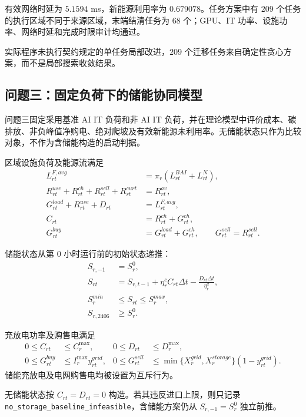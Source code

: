 有效网络时延为 $5.1594$ ms，新能源利用率为 $0.679078$。任务方案中有 $209$ 个任务的执行区域不同于来源区域，末端结清任务为 $68$ 个；GPU、IT 功率、设施功率、网络时延和完成时限审计均通过。

实际程序未执行契约规定的单任务局部改进，$209$ 个迁移任务来自确定性贪心方案，而不是局部搜索收敛结果。

\subsection{问题三：固定负荷下的储能协同模型}

问题三固定采用基准 AI IT 负荷和非 AI IT 负荷，并在理论模型中评价成本、碳排放、非负峰值净购电、绝对爬坡及有效新能源未利用率。无储能状态只作为比较对象，不作为含储能构造的启动判据。

区域设施负荷及能源流满足
\begin{align}
L_{rt}^{F,avg}&=\pi_r(L_{rt}^{BAI}+L_{rt}^{N}),\\
R_{rt}^{use}+R_{rt}^{ch}+R_{rt}^{sell}+R_{rt}^{curt}&=R_{rt}^{av},\\
G_{rt}^{load}+R_{rt}^{use}+D_{rt}&=L_{rt}^{F,avg},\\
C_{rt}&=R_{rt}^{ch}+G_{rt}^{ch},\\
G_{rt}^{buy}&=G_{rt}^{load}+G_{rt}^{ch},\qquad
G_{rt}^{sell}=R_{rt}^{sell}.
\end{align}

储能状态从第 $0$ 小时运行前的初始状态递推：
\begin{align}
S_{r,-1}&=S_r^0,\\
S_{rt}&=S_{r,t-1}+\eta_r^cC_{rt}\Delta t
-\frac{D_{rt}\Delta t}{\eta_r^d},\\
S_r^{min}&\le S_{rt}\le S_r^{max},\\
S_{r,2406}&\ge S_r^0.
\end{align}

充放电功率及购售电满足
\begin{align}
0\le C_{rt}&\le C_r^{\max},&
0\le D_{rt}&\le D_r^{\max},\\
0\le G_{rt}^{buy}&\le I_r^{\max}y_{rt}^{grid},&
0\le G_{rt}^{sell}
&\le\min\{X_r^{grid},X_r^{storage}\}(1-y_{rt}^{grid}).
\end{align}
储能充放电及电网购售电均被设置为互斥行为。

无储能状态按 $C_{rt}=D_{rt}=0$ 构造。若其违反进口上限，则只记录 \texttt{no\_storage\_baseline\_infeasible}，含储能方案仍从 $S_{r,-1}=S_r^0$ 独立前推。

